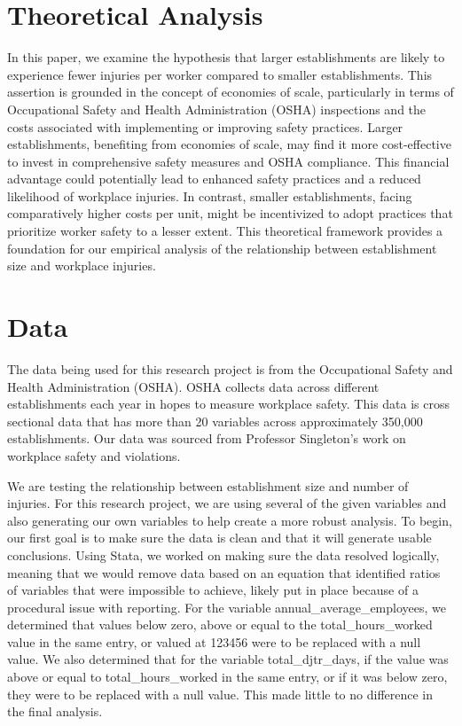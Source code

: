 \documentclass[12pt]{article}
\begin{document}
\section{Theoretical Analysis}
\label{sec:theory}

In this paper, we examine the hypothesis that larger establishments are likely to experience fewer injuries per worker compared to smaller establishments. This assertion is grounded in the concept of economies of scale, particularly in terms of Occupational Safety and Health Administration (OSHA) inspections and the costs associated with implementing or improving safety practices. Larger establishments, benefiting from economies of scale, may find it more cost-effective to invest in comprehensive safety measures and OSHA compliance. This financial advantage could potentially lead to enhanced safety practices and a reduced likelihood of workplace injuries. In contrast, smaller establishments, facing comparatively higher costs per unit, might be incentivized to adopt practices that prioritize worker safety to a lesser extent. This theoretical framework provides a foundation for our empirical analysis of the relationship between establishment size and workplace injuries.
\section{Data}
\label{sec:data}

The data being used for this research project is from the Occupational Safety and Health Administration (OSHA). OSHA collects data across different establishments each year in hopes to measure workplace safety. This data is cross sectional data that has more than 20 variables across approximately 350,000 establishments. Our data was sourced from Professor Singleton’s work on workplace safety and violations.
   
We are testing the relationship between establishment size and number of injuries. For this research project, we are using several of the given variables and also generating our own variables to help create a more robust analysis. To begin, our first goal is to make sure the data is clean and that it will generate usable conclusions. Using Stata, we worked on making sure the data resolved logically, meaning that we would remove data based on an equation that identified ratios of variables that were impossible to achieve, likely put in place because of a procedural issue with reporting. For the variable annual\_average\_employees, we determined that values below zero, above or equal to the total\_hours\_worked value in the same entry, or valued at 123456 were to be replaced with a null value. We also determined that for the variable total\_djtr\_days, if the value was above or equal to total\_hours\_worked in the same entry, or if it was below zero, they were to be replaced with a null value. This made little to no difference in the final analysis.
    
\end{document}

